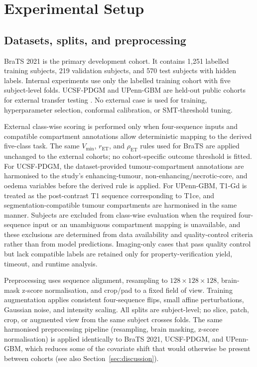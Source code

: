 \documentclass[preprint,11pt]{elsarticle}
\begin{document}
\section{Experimental Setup}
\label{sec:experiments}

\subsection{Datasets, splits, and preprocessing}

BraTS 2021 is the primary development cohort. It contains 1,251 labelled training subjects, 219 validation subjects, and 570 test subjects with hidden labels. Internal experiments use only the labelled training cohort with five subject-level folds. UCSF-PDGM and UPenn-GBM are held-out public cohorts for external transfer testing \cite{brats2021,ucsf2022,upenn2022}. No external case is used for training, hyperparameter selection, conformal calibration, or SMT-threshold tuning.

External class-wise scoring is performed only when four-sequence inputs and compatible compartment annotations allow deterministic mapping to the derived five-class task. The same $V_{\min}$, $r_{\mathrm{ET}}$, and $\rho_{\mathrm{ET}}$ rules used for BraTS are applied unchanged to the external cohorts; no cohort-specific outcome threshold is fitted. For UCSF-PDGM, the dataset-provided tumour-compartment annotations are harmonised to the study's enhancing-tumour, non-enhancing/necrotic-core, and oedema variables before the derived rule is applied. For UPenn-GBM, T1-Gd is treated as the post-contrast T1 sequence corresponding to T1ce, and segmentation-compatible tumour compartments are harmonised in the same manner. Subjects are excluded from class-wise evaluation when the required four-sequence input or an unambiguous compartment mapping is unavailable, and these exclusions are determined from data availability and quality-control criteria rather than from model predictions. Imaging-only cases that pass quality control but lack compatible labels are retained only for property-verification yield, timeout, and runtime analysis.

Preprocessing uses sequence alignment, resampling to $128\times128\times128$, brain-mask z-score normalisation, and crop/pad to a fixed field of view. Training augmentation applies consistent four-sequence flips, small affine perturbations, Gaussian noise, and intensity scaling. All splits are subject-level; no slice, patch, crop, or augmented view from the same subject crosses folds. The same harmonised preprocessing pipeline (resampling, brain masking, z-score normalisation) is applied identically to BraTS 2021, UCSF-PDGM, and UPenn-GBM, which reduces some of the covariate shift that would otherwise be present between cohorts (see also Section~\ref{sec:discussion}).
\end{document}
